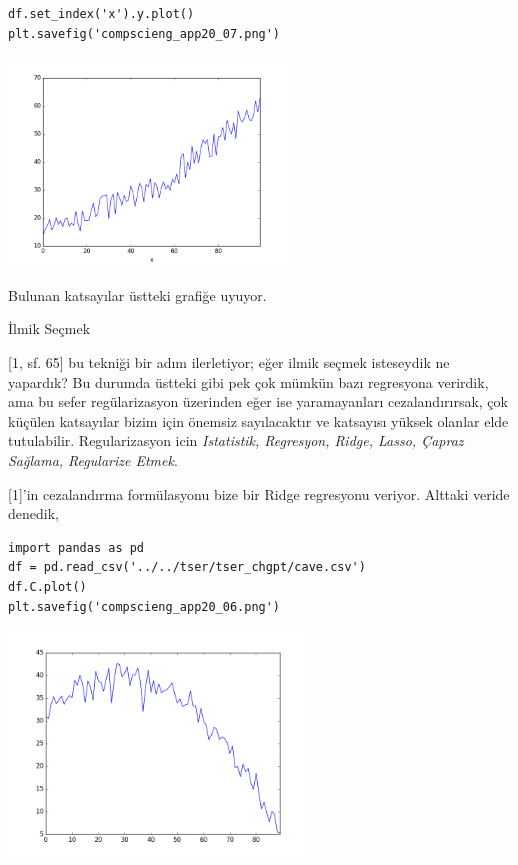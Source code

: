 \documentclass[12pt,fleqn]{article}\usepackage{../../common}
\begin{document}
\begin{verbatim}
df.set_index('x').y.plot()
plt.savefig('compscieng_app20_07.png')
\end{verbatim}

\includegraphics[width=20em]{compscieng_app20_07.png}

Bulunan katsayılar üstteki grafiğe uyuyor. 

İlmik Seçmek

[1, sf. 65] bu tekniği bir adım ilerletiyor; eğer ilmik seçmek isteseydik
ne yapardık? Bu durumda üstteki gibi pek çok mümkün bazı regresyona
verirdik, ama bu sefer regülarizasyon üzerinden eğer ise yaramayanları
cezalandırırsak, çok küçülen katsayılar bizim için önemsiz sayılacaktır ve
katsayısı yüksek olanlar elde tutulabilir. Regularizasyon icin {\em
  Istatistik, Regresyon, Ridge, Lasso, Çapraz Sağlama, Regularize Etmek}.

[1]'in cezalandırma formülasyonu bize bir Ridge regresyonu veriyor. Alttaki
veride denedik,

\begin{verbatim}
import pandas as pd
df = pd.read_csv('../../tser/tser_chgpt/cave.csv')
df.C.plot()
plt.savefig('compscieng_app20_06.png')
\end{verbatim}

\includegraphics[height=6cm]{compscieng_app20_06.png}
\end{document}
